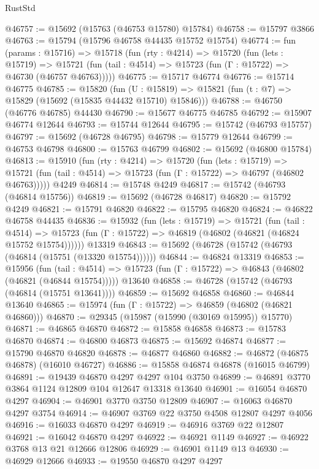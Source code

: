 \begin{lexlean}{RustStd}
\begin{coremodule}
@46757 := @15692 (@15763 (@46753 @15780) @15784)
@46758 := @15797 @3866
@46763 := @15794 (@15796 @46758 @44435 @15752 @15754)
@46774 := fun (params : @15716) =>
  @15718
    (fun (rty : @4214) =>
    @15720
      (fun (lets : @15719) =>
      @15721 (fun (tail : @4514) => @15723 (fun (Γ : @15722) => @46730 (@46757 @46763)))))
@46775 := @15717 @46774
@46776 := @15714 @46775
@46785 := @15820
    (fun (U : @15819) => @15821 (fun (t : @7) => @15829 (@15692 (@15835 @44432 @15710) @15846)))
@46788 := @46750 (@46776 @46785) @44430
@46790 := @15677 @46775 @46785
@46792 := @15907 @46774 @12644
@46793 := @15744 @12644
@46795 := @15742 (@46793 @15757)
@46797 := @15692 (@46728 @46795)
@46798 := @15779 @12644
@46799 := @46753 @46798
@46800 := @15763 @46799
@46802 := @15692 (@46800 @15784)
@46813 := @15910
    (fun (rty : @4214) =>
    @15720
      (fun (lets : @15719) =>
      @15721 (fun (tail : @4514) => @15723 (fun (Γ : @15722) => @46797 (@46802 @46763)))))
    @4249
@46814 := @15748 @4249
@46817 := @15742 (@46793 (@46814 @15756))
@46819 := @15692 (@46728 @46817)
@46820 := @15792 @4249
@46821 := @15791 @46820
@46822 := @15795 @46820
@46824 := @46822 @46758 @44435
@46836 := @15932
    (fun (lets : @15719) =>
    @15721
      (fun (tail : @4514) =>
      @15723 (fun (Γ : @15722) => @46819 (@46802 (@46821 (@46824 @15752 @15754))))))
    @13319
@46843 := @15692 (@46728 (@15742 (@46793 (@46814 (@15751 (@13320 @15754))))))
@46844 := @46824 @13319
@46853 := @15956
    (fun (tail : @4514) => @15723 (fun (Γ : @15722) => @46843 (@46802 (@46821 (@46844 @15754)))))
    @13640
@46858 := @46728 (@15742 (@46793 (@46814 (@15751 @13641))))
@46859 := @15692 @46858
@46860 := @46844 @13640
@46865 := @15974 (fun (Γ : @15722) => @46859 (@46802 (@46821 @46860)))
@46870 := @29345 (@15987 (@15990 (@30169 @15995)) @15770)
@46871 := @46865 @46870
@46872 := @15858 @46858
@46873 := @15783 @46870
@46874 := @46800 @46873
@46875 := @15692 @46874
@46877 := @15790 @46870 @46820
@46878 := @46877 @46860
@46882 := @46872 (@46875 @46878) (@16010 @46727)
@46886 := @15858 @46874 @46878 (@16015 @46799)
@46891 := @19439 @46870 @4297 @4297 @104 @3750
@46899 := @46891 @3770 @3864 @1124 @12809 @104 @12647 @13318 @13640
@46901 := @16054 @46870 @4297
@46904 := @46901 @3770 @3750 @12809
@46907 := @16063 @46870 @4297 @3754
@46914 := @46907 @3769 @22 @3750 @4508 @12807 @4297 @4056
@46916 := @16033 @46870 @4297
@46919 := @46916 @3769 @22 @12807
@46921 := @16042 @46870 @4297
@46922 := @46921 @1149
@46927 := @46922 @3768 @13 @21 @12666 @12806
@46929 := @46901 @1149 @13
@46930 := @46929 @12666
@46933 := @19550 @46870 @4297 @4297

\end{coremodule}
\end{lexlean}
